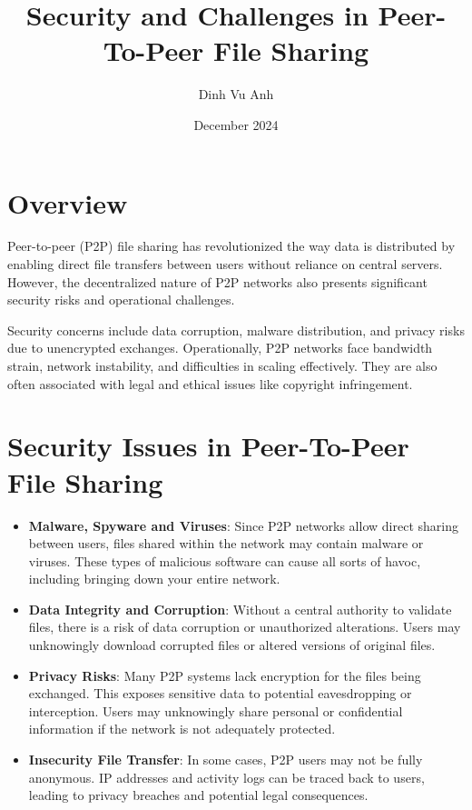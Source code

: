 \documentclass{article}
\title{Security and Challenges in Peer-To-Peer File Sharing}
\author{Dinh Vu Anh}
\date{December 2024}
\begin{document}
\maketitle

\section{Overview}
Peer-to-peer (P2P) file sharing has revolutionized the way data is distributed by enabling direct file transfers between users without reliance on central servers. However, the decentralized nature of P2P networks also presents significant security risks and operational challenges.

\vspace{1em}
\noindent Security concerns include data corruption, malware distribution, and privacy risks due to unencrypted exchanges. Operationally, P2P networks face bandwidth strain, network instability, and difficulties in scaling effectively. They are also often associated with legal and ethical issues like copyright infringement.

\section{Security Issues in Peer-To-Peer File Sharing}

\begin{itemize}
    \item \textbf{Malware, Spyware and Viruses}: Since P2P networks allow direct sharing between users, files shared within the network may contain malware or viruses. These types of malicious software can cause all sorts of havoc, including bringing down your entire network. 
    \item \textbf{Data Integrity and Corruption}: Without a central authority to validate files, there is a risk of data corruption or unauthorized alterations. Users may unknowingly download corrupted files or altered versions of original files.
    \item \textbf{Privacy Risks}: Many P2P systems lack encryption for the files being exchanged. This exposes sensitive data to potential eavesdropping or interception. Users may unknowingly share personal or confidential information if the network is not adequately protected.
    \item \textbf{Insecurity File Transfer}: In some cases, P2P users may not be fully anonymous. IP addresses and activity logs can be traced back to users, leading to privacy breaches and potential legal consequences.
\end{itemize}
\end{document}
